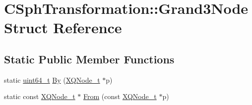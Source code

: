 \hypertarget{structCSphTransformation_1_1Grand3Node}{\section{C\-Sph\-Transformation\-:\-:Grand3\-Node Struct Reference}
\label{structCSphTransformation_1_1Grand3Node}
}
\subsection*{Static Public Member Functions}
\begin{DoxyCompactItemize}
\item 
static \hyperlink{sphinxstd_8h_aaa5d1cd013383c889537491c3cfd9aad}{uint64\-\_\-t} \hyperlink{structCSphTransformation_1_1Grand3Node_a4946a4fdb7a472909f8d3c1999697035}{By} (\hyperlink{structXQNode__t}{X\-Q\-Node\-\_\-t} $\ast$p)
\item 
static const \hyperlink{structXQNode__t}{X\-Q\-Node\-\_\-t} $\ast$ \hyperlink{structCSphTransformation_1_1Grand3Node_ad6052b3752c7775913d371393c5b97b9}{From} (const \hyperlink{structXQNode__t}{X\-Q\-Node\-\_\-t} $\ast$p)
\end{DoxyCompactItemize}



